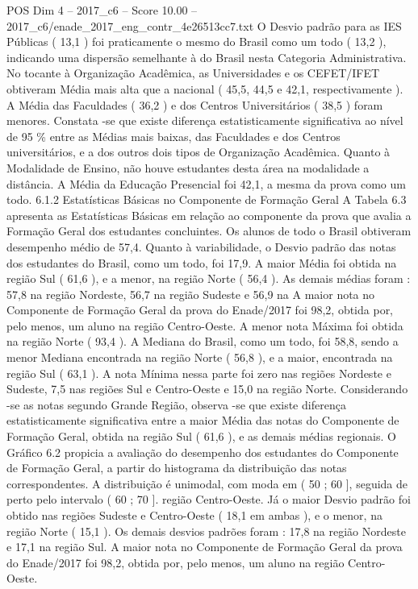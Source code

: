\begin{textsample}{POS Dim 4 – 2017\_c6 – Score 10.00 – 2017\_c6/enade\_2017\_eng\_contr\_4e26513cc7.txt}
O Desvio padrão para as IES Públicas ( 13,1 ) foi praticamente o mesmo do Brasil como um todo ( 13,2 ), indicando uma dispersão semelhante à do Brasil nesta Categoria Administrativa.
No tocante à Organização Acadêmica, as Universidades e os CEFET/IFET obtiveram Média mais alta que a nacional ( 45,5, 44,5 e 42,1, respectivamente ).
A Média das Faculdades ( 36,2 ) e dos Centros Universitários ( 38,5 ) foram menores.
Constata -se que existe diferença estatisticamente significativa ao nível de 95 \% entre as Médias mais baixas, das Faculdades e dos Centros universitários, e a dos outros dois tipos de Organização Acadêmica.
Quanto à Modalidade de Ensino, não houve estudantes desta área na modalidade a distância.
A Média da Educação Presencial foi 42,1, a mesma da prova como um todo. 6.1.2 Estatísticas Básicas no Componente de Formação Geral A Tabela 6.3 apresenta as Estatísticas Básicas em relação ao componente da prova que avalia a Formação Geral dos estudantes concluintes.
Os alunos de todo o Brasil obtiveram desempenho médio de 57,4.
Quanto à variabilidade, o Desvio padrão das notas dos estudantes do Brasil, como um todo, foi 17,9.
A maior Média foi obtida na região Sul ( 61,6 ), e a menor, na região Norte ( 56,4 ).
As demais médias foram : 57,8 na região Nordeste, 56,7 na região Sudeste e 56,9 na A maior nota no Componente de Formação Geral da prova do Enade/2017 foi 98,2, obtida por, pelo menos, um aluno na região Centro-Oeste.
A menor nota Máxima foi obtida na região Norte ( 93,4 ).
A Mediana do Brasil, como um todo, foi 58,8, sendo a menor Mediana encontrada na região Norte ( 56,8 ), e a maior, encontrada na região Sul ( 63,1 ).
A nota Mínima nessa parte foi zero nas regiões Nordeste e Sudeste, 7,5 nas regiões Sul e Centro-Oeste e 15,0 na região Norte.
Considerando -se as notas segundo Grande Região, observa -se que existe diferença estatisticamente significativa entre a maior Média das notas do Componente de Formação Geral, obtida na região Sul ( 61,6 ), e as demais médias regionais.
O Gráfico 6.2 propicia a avaliação do desempenho dos estudantes do Componente de Formação Geral, a partir do histograma da distribuição das notas correspondentes.
A distribuição é unimodal, com moda em ( 50 ; 60 ], seguida de perto pelo intervalo ( 60 ; 70 ]. região Centro-Oeste.
Já o maior Desvio padrão foi obtido nas regiões Sudeste e Centro-Oeste ( 18,1 em ambas ), e o menor, na região Norte ( 15,1 ).
Os demais desvios padrões foram : 17,8 na região Nordeste e 17,1 na região Sul.
A maior nota no Componente de Formação Geral da prova do Enade/2017 foi 98,2, obtida por, pelo menos, um aluno na região Centro-Oeste.

\end{textsample}
